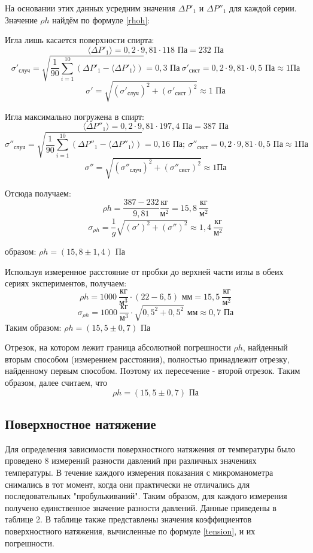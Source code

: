 \documentclass[15pt,a5paper,reqno]{article}
\begin{document}
    На основании этих данных усредним значения $\Delta P'_1$ и $\Delta P''_1$ для каждой серии. Значение $\rho h$ найдём по формуле \eqref{rhoh}:

    \noindent Игла лишь касается поверхности спирта:
    \[\langle\Delta P'_1\rangle = 0,2 \cdot 9,81 \cdot 118\text{ Па} = 232\text{ Па}\]
    \[\sigma'_{\text{случ}} = \sqrt{\frac{1}{90}\sum_{i = 1}^{10}(\Delta P'_1 - \langle\Delta P'_1\rangle)} = 0,3\text{ Па}\ \sigma'_{\text{сист}} = 0,2 \cdot 9,81 \cdot 0,5\text{ Па} \approx 1\text {Па}\]
    \[\sigma' = \sqrt{(\sigma'_{\text{случ}})^2 + (\sigma'_{\text{сист}})^2} \approx 1\text{ Па}\]
    
    \noindent Игла максимально погружена в спирт:
    \[\langle\Delta P''_1\rangle = 0,2 \cdot 9,81 \cdot 197,4\text{ Па} = 387\text{ Па}\]
    \[\sigma''_{\text{случ}} = \sqrt{\frac{1}{90}\sum_{i = 1}^{10}(\Delta P''_1 - \langle\Delta P''_1\rangle)} = 0,16\text{ Па};\ \sigma''_{\text{сист}} = 0,2 \cdot 9,81 \cdot 0,5\text{ Па} \approx 1\text {Па}\]
    \[\sigma'' = \sqrt{(\sigma''_{\text{случ}})^2 + (\sigma''_{\text{сист}})^2} \approx 1\text {Па}\]
    
    \noindent Отсюда получаем:
    \[\rho h = \frac{387 - 232}{9,81}\frac{\text{кг}}{\text{м}^2} = 15,8\ \frac{\text{кг}}{\text{м}^2}\]
    \[\sigma_{\rho h} = \frac{1}{g}\sqrt{(\sigma')^2 + (\sigma'')^2} \approx 1,4\ \frac{\text{кг}}{\text{м}^2}\]
    
     образом: $\rho h = (15,8 \pm 1,4)\text{ Па}$
    
    Используя измеренное расстояние от пробки до верхней части иглы в обеих сериях экспериментов, получаем:
    \[\rho h = 1000\ \frac{\text{кг}}{\text{м}^3} \cdot (22 - 6,5)\text{ мм} = 15,5\ \frac{\text{кг}}{\text{м}^2}\]
    \[\sigma_{\rho h} = 1000\ \frac{\text{кг}}{\text{м}^3} \cdot \sqrt{0,5^2 + 0,5^2}\text{ мм} \approx 0,7\text{ Па}\]
    Таким образом: $\rho h = (15,5 \pm 0,7)\text{ Па}$
    
    Отрезок, на котором лежит граница абсолютной погрешности $\rho h$, найденный вторым способом (измерением расстояния), полностью принадлежит отрезку, найденному первым способом. Поэтому их пересечение - второй отрезок. Таким образом, далее считаем, что 
    \[\rho h = (15,5 \pm 0,7)\text{ Па}\]
    
    \subsection{Поверхностное натяжение}
    Для определения зависимости поверхностного натяжения от температуры было проведено 8 измерений разности давлений при различных значениях температуры. В течение каждого измерения показания с микроманометра снимались в тот момент, когда они практически не отличались для последовательных "пробулькиваний". Таким образом, для каждого измерения получено единственное значение разности давлений. Данные приведены в таблице 2. В таблице также представлены значения коэффициентов поверхностного натяжения, вычисленные по формуле \eqref{tension}, и их погрешности.
    
\end{document}
